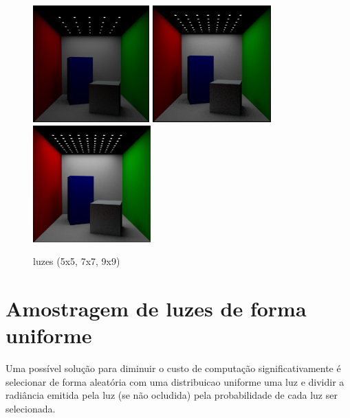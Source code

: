\documentclass[a4paper]{report}
\begin{document}
\begin{figure}[H]
    \centering
    \includegraphics[height=4.5cm]{images/5_lights.png}
    \includegraphics[height=4.5cm]{images/7_lights.png}
    \includegraphics[height=4.5cm]{images/9_lights.png}
    \caption{luzes (5x5, 7x7, 9x9)}
\end{figure}

\section{Amostragem de luzes de forma uniforme}

Uma possível solução para diminuir o custo de computação significativamente é
selecionar de forma aleatória com uma distribuicao uniforme uma luz e dividir a
radiância emitida pela luz (se não ocludida) pela probabilidade de cada luz ser
selecionada.
\end{document}
